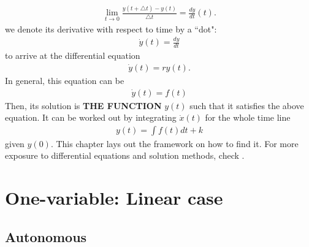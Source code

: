 \documentclass[11pt,a4paper]{book}
\theoremstyle{definition}\newtheorem{definition}{Definition}
\theoremstyle{definition}\newtheorem{fact}{Fact}
\theoremstyle{definition}\newtheorem{remark}{Remark}
\theoremstyle{definition}\newtheorem{ex}{Ex.}
\theoremstyle{definition}\newtheorem{project}{Project}
\theoremstyle{definition}\newtheorem{problem}{Problem}
\theoremstyle{definition}\newtheorem{example}{Example}
\numberwithin{theorem}{section}
\numberwithin{corollary}{chapter}
\numberwithin{assumption}{chapter}
\numberwithin{definition}{chapter}
\numberwithin{prop}{chapter}
\numberwithin{notation}{chapter}
\numberwithin{problem}{chapter}
\numberwithin{example}{chapter}
\numberwithin{fact}{chapter}
\numberwithin{ex}{chapter}
\begin{document}
	\begin{align*}
		\lim_{t\to 0} \frac{y(t+\triangle t) - y(t)}{ \triangle t } = \frac{dy}{dt}(t).
	\end{align*}
	we denote its derivative with respect to time by a ``dot":
	\begin{align*}
		\dot{y}(t) = \frac{dy}{dt}
	\end{align*}
	to arrive at the differential equation
	\begin{align*}
		\dot{y}(t) = r y(t).
	\end{align*}
	In general, this equation can be
	\begin{align*}
		\dot{y}(t) = f(t)
	\end{align*}
	Then, its solution is \textbf{THE FUNCTION} $y(t)$ such that it satisfies the above equation. It can be worked out by integrating $\dot{x}(t)$ for the whole time line
	\begin{align*}
		y(t) = \int f(t) dt + k
	\end{align*}
	given $y(0)$. This chapter lays out the framework on how to find it. For more exposure to differential equations and solution methods, check \citet[Ch 8.6]{springcamp}.
	
	\section{One-variable: Linear case}
	\subsection{Autonomous}
\end{document}
